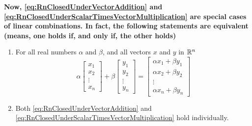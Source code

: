 \begin{tcolorbox}
\textbf{Now, \eqref{eq:RnClosedUnderVectorAddition} and \eqref{eq:RnClosedUnderScalarTimesVectorMultiplication} are special cases of linear combinations. In fact, the following statements are equivalent (means, one holds if, and only if, the other holds)}
\begin{enumerate}
\renewcommand{\labelenumi}{(\alph{enumi})}
\setlength{\itemsep}{.2cm}

\item For all real numbers $\alpha$ and $\beta$, and all vectors $x$ and $y$ in $\mathbb R^n$
\begin{equation}
    \label{eq:RnClosedUnderLinearCombinations}
    \alpha  \begin{bmatrix} x_1 \\ x_2 \\ \vdots \\ x_n\end{bmatrix} + \beta
 \begin{bmatrix} y_1 \\ y_2 \\ \vdots \\ y_n\end{bmatrix} =
   \begin{bmatrix} \alpha x_1 + \beta y_1\\ \alpha x_2 + \beta y_2 \\ \vdots \\ \alpha x_n + \beta y_n\end{bmatrix}
   \end{equation}
   
   \item Both \eqref{eq:RnClosedUnderVectorAddition} and \eqref{eq:RnClosedUnderScalarTimesVectorMultiplication} hold individually.
\end{enumerate}
\end{tcolorbox}

